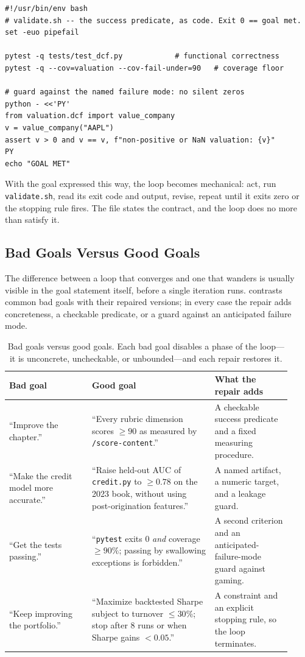 \begin{verbatim}
#!/usr/bin/env bash
# validate.sh -- the success predicate, as code. Exit 0 == goal met.
set -euo pipefail

pytest -q tests/test_dcf.py            # functional correctness
pytest -q --cov=valuation --cov-fail-under=90   # coverage floor

# guard against the named failure mode: no silent zeros
python - <<'PY'
from valuation.dcf import value_company
v = value_company("AAPL")
assert v > 0 and v == v, f"non-positive or NaN valuation: {v}"
PY
echo "GOAL MET"
\end{verbatim}

With the goal expressed this way, the loop becomes mechanical: act, run \texttt{validate.sh}, read its exit code and output, revise, repeat until it exits zero or the stopping rule fires. The file states the contract, and the loop does no more than satisfy it.

\subsection{Bad Goals Versus Good Goals}\label{subsec:bad-vs-good-goals}

The difference between a loop that converges and one that wanders is usually visible in the goal statement itself, before a single iteration runs.  contrasts common bad goals with their repaired versions; in every case the repair adds concreteness, a checkable predicate, or a guard against an anticipated failure mode.

\begin{table}[t]
\centering
\begin{tabular}{@{}p{0.27\linewidth}p{0.40\linewidth}p{0.25\linewidth}@{}}
\toprule
\textbf{Bad goal} & \textbf{Good goal} & \textbf{What the repair adds} \\
\midrule
``Improve the chapter.'' & ``Every rubric dimension scores $\geq 90$ as measured by \texttt{/score-content}.'' & A checkable success predicate and a fixed measuring procedure. \\
\addlinespace
``Make the credit model more accurate.'' & ``Raise held-out AUC of \texttt{credit.py} to $\geq 0.78$ on the 2023 book, without using post-origination features.'' & A named artifact, a numeric target, and a leakage guard. \\
\addlinespace
``Get the tests passing.'' & ``\texttt{pytest} exits 0 \emph{and} coverage $\geq 90\%$; passing by swallowing exceptions is forbidden.'' & A second criterion and an anticipated-failure-mode guard against gaming. \\
\addlinespace
``Keep improving the portfolio.'' & ``Maximize backtested Sharpe subject to turnover $\leq 30\%$; stop after 8 runs or when Sharpe gains $< 0.05$.'' & A constraint and an explicit stopping rule, so the loop terminates. \\
\bottomrule
\end{tabular}
\caption{Bad goals versus good goals. Each bad goal disables a phase of the loop---it is unconcrete, uncheckable, or unbounded---and each repair restores it.}
\label{tab:bad-vs-good}
\end{table}

